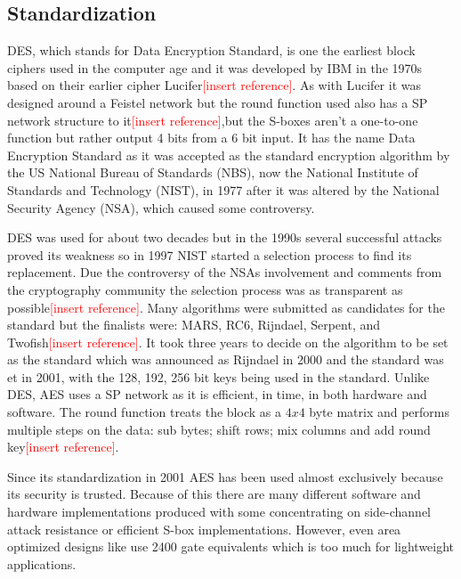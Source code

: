 \documentclass[12pt,twoside,a4paper]{report}
\begin{document}
	\subsection{Standardization}
	DES, which stands for Data Encryption Standard, is one the earliest block ciphers used in the computer age and it was developed by IBM in the 1970s based on their earlier cipher Lucifer\textcolor{red}{[insert reference]}. As with Lucifer it was designed around a Feistel network but the round function used also has a SP network structure to it\textcolor{red}{[insert reference]},but the S-boxes aren't a one-to-one function but rather output 4 bits from a 6 bit input. It has the name Data Encryption Standard as it was accepted as the standard encryption algorithm by the US National Bureau of Standards (NBS), now the National Institute of Standards and Technology (NIST), in 1977 after it was altered by the National Security Agency (NSA), which caused some controversy\cite{ComputerSecurityDivision1999}.
    
	DES was used for about two decades but in the 1990s several successful attacks proved its weakness\cite{Team} so in 1997 NIST started a selection process to find its replacement. Due the controversy of the NSAs involvement and comments from the cryptography community the selection process was as transparent as possible\textcolor{red}{[insert reference]}. Many algorithms were submitted as candidates for the standard but the finalists were: MARS, RC6, Rijndael, Serpent, and Twofish\textcolor{red}{[insert reference]}. It took three years to decide on the algorithm to be set as the standard which was announced as Rijndael in 2000 and the standard was et in 2001, with the 128, 192, 256 bit keys being used in the standard\cite{ComputerSecurityDivision2001}. Unlike DES, AES uses a SP network as it is efficient, in time, in both hardware and software. The round function treats the block as a $4x4$ byte matrix and performs multiple steps on the data: sub bytes; shift rows; mix columns and add round key\textcolor{red}{[insert reference]}.

    
	Since its standardization in 2001 AES has been used almost exclusively because its security is trusted. Because of this there are many different software and hardware implementations produced with some concentrating on side-channel attack resistance\cite{Strachacki2008} or efficient S-box implementations\cite{Gomes2016}. However, even area optimized designs like \cite{Moradi2011} use 2400 gate equivalents which is too much for lightweight applications.
    
\end{document}
